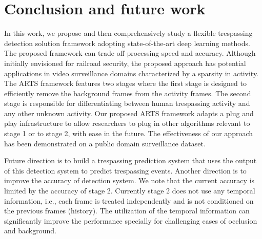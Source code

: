 \section{Conclusion and future work}
\label{sec:conclusion}
In this work, we propose and then comprehensively study a flexible trespassing detection solution framework adopting state-of-the-art deep learning methods. The proposed framework can trade off processing speed and accuracy. Although initially envisioned for railroad security, the proposed approach has potential applications in video surveillance domains characterized by a sparsity in activity.  The ARTS framework features two stages where the first stage is designed to efficiently remove the background frames from the activity frames. The second stage is responsible for differentiating between human trespassing activity and any other unknown activity. Our proposed ARTS framework adapts a plug and play infrastructure to allow researchers to plug in other algorithms relevant to stage 1 or to stage 2, with ease in the future. The effectiveness of our approach has been demonstrated on a public domain surveillance dataset. 

Future direction is to build a trespassing prediction system that uses the output of this detection system to predict trespassing events. Another direction is to improve the accuracy of detection system. We note that the current accuracy is limited by the accuracy of stage 2. Currently stage 2 does not use any temporal information, i.e., each frame is treated independently and is not conditioned on the previous frames (history). The utilization of the temporal information can significantly improve the performance specially for challenging cases of occlusion and background.